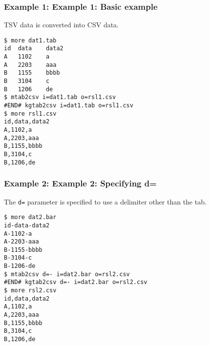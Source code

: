 \subsubsection*{Example 1: Example 1: Basic example}

TSV data is converted into CSV data.


\begin{Verbatim}[baselinestretch=0.7,frame=single]
$ more dat1.tab
id	data	data2
A	1102	a
A	2203	aaa
B	1155	bbbb
B	3104	c
B	1206	de
$ mtab2csv i=dat1.tab o=rsl1.csv
#END# kgtab2csv i=dat1.tab o=rsl1.csv
$ more rsl1.csv
id,data,data2
A,1102,a
A,2203,aaa
B,1155,bbbb
B,3104,c
B,1206,de
\end{Verbatim}
\subsubsection*{Example 2: Example 2: Specifying d=}

The \verb|d=| parameter is specified to use a delimiter other than the tab.


\begin{Verbatim}[baselinestretch=0.7,frame=single]
$ more dat2.bar
id-data-data2
A-1102-a
A-2203-aaa
B-1155-bbbb
B-3104-c
B-1206-de
$ mtab2csv d=- i=dat2.bar o=rsl2.csv
#END# kgtab2csv d=- i=dat2.bar o=rsl2.csv
$ more rsl2.csv
id,data,data2
A,1102,a
A,2203,aaa
B,1155,bbbb
B,3104,c
B,1206,de
\end{Verbatim}

